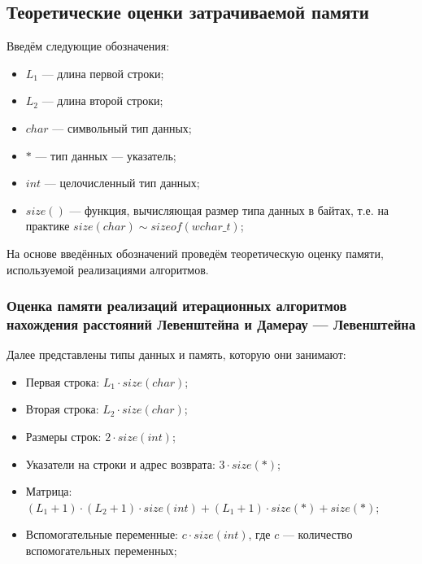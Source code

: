 
\newpage

\subsection{Теоретические оценки затрачиваемой памяти}

Введём следующие обозначения:
\begin{itemize}
    \item $L_1$ --- длина первой строки;
    \item $L_2$ --- длина второй строки;
    \item $char$ --- символьный тип данных;
    \item $*$ --- тип данных --- указатель;
    \item $int$ --- целочисленный тип данных;
    \item $size()$ --- функция, вычисляющая размер типа данных в байтах, т.е. на практике $size(char) \sim sizeof(wchar\_t)$;
\end{itemize}

На основе введённых обозначений проведём теоретическую оценку памяти, используемой реализациями алгоритмов.

\subsubsection{Оценка памяти реализаций итерационных алгоритмов нахождения расстояний Левенштейна и Дамерау --- Левенштейна}
Далее представлены типы данных и память, которую они занимают:
\begin{itemize}
    \item Первая строка: $L_1 \cdot size(char)$;
    \item Вторая строка: $L_2 \cdot size(char)$;
    \item Размеры строк: $2 \cdot size(int)$;
    \item Указатели на строки и адрес возврата: $3 \cdot size(*)$;
    \item Матрица: $(L_1 + 1) \cdot (L_2 + 1) \cdot size(int) + (L_1 + 1) \cdot size(*) + size(*)$;
    \item Вспомогательные переменные: $c \cdot size(int)$, где $c$ --- количество вспомогательных переменных;
\end{itemize}

